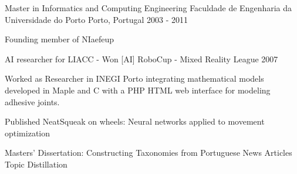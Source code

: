 

\begin{cventries}

  \cventry
    {Master in Informatics and Computing Engineering} %
    {Faculdade de Engenharia da Universidade do Porto} %
    {Porto, Portugal} %
    {2003 - 2011} %
    {
      \begin{cvitems} %
	\item {Founding member of NIaefeup }
        \item {AI researcher for LIACC - Won [AI] RoboCup - Mixed Reality League 2007}
        \item {Worked as Researcher in INEGI Porto integrating mathematical models developed in Maple and C with a PHP HTML web interface for modeling adhesive joints. }
        \item {Published NeatSqueak on wheels: Neural networks applied to movement optimization}
        \item {Masters' Dissertation: Constructing Taxonomies from Portuguese News Articles Topic Distillation}
      \end{cvitems}
    }

\end{cventries}
